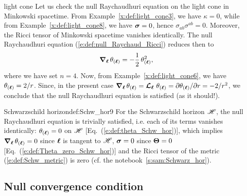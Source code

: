 \begin{texample}{light cone}{}
Let us check the null Raychaudhuri equation on the light cone in Minkowski
spacetime. From Example~\ref{x:def:light_cone3}, we have $\kappa=0$, while
from Example~\ref{x:def:light_cone8}, we have $\bm{\sigma}=0$,
hence $\sigma_{ab} \sigma^{ab}=0$. Moreover, the Ricci tensor of Minkowski
spacetime vanishes identically. The null Raychaudhuri equation
(\ref{e:def:null_Raychaud_Ricci})
reduces then to
\[
    \bm{\nabla}_{\bm{\ell}}\,  \theta_{(\bm{\ell})} =  - \frac{1}{2} \, \theta_{(\bm{\ell})}^2 ,
\]
where we have set $n=4$. Now, from Example~\ref{x:def:light_cone6}, we
have $\theta_{(\bm{\ell})} = 2/r$. Since, in the present case
$\bm{\nabla}_{\bm{\ell}}\,  \theta_{(\bm{\ell})}  = \bm{\mathcal{L}}_{\bm{\ell}}\, \,  \theta_{(\bm{\ell})}  = {\partial \theta_{(\bm{\ell})}}/{\partial r} =
- 2/r^2$, we conclude that the null Raychaudhuri equation is satisfied (as
it should!).
\end{texample}

\begin{texample}{Schwarzschild horizon}{def:Schw_hor9}
For the Schwarzschild horizon $\mathscr{H}$, the null Raychaudhuri equation is
trivially satisfied, i.e. each of its terms vanishes identically:
$\theta_{(\bm{\ell})}=0$ on $\mathscr{H}$ [Eq.~(\ref{e:def:theta_Schw_hor})],
which implies $\bm{\nabla}_{\bm{\ell}}\,  \theta_{(\bm{\ell})}=0$ since $\bm{\ell}$ is tangent to $\mathscr{H}$,
$\bm{\sigma}=0$ since $\bm{\Theta}=0$ [Eq.~(\ref{e:def:Theta_zero_Schw_hor})]
and the Ricci tensor of the metric (\ref{e:def:Schw_metric}) is zero
(cf. the notebook~\ref{s:sam:Schwarz_hor}).
\end{texample}


\subsection{Null convergence condition} \label{s:def:null_convergence_cond}

